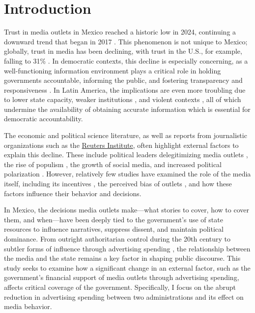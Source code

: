 \section{Introduction}

Trust in media outlets in Mexico reached a historic low in 2024, continuing a downward trend that began in 2017 \citep{Reuters}. This phenomenon is not unique to Mexico; globally, trust in media has been declining, with trust in the U.S., for example, falling to 31\% \citep{Gallup-US}. In democratic contexts, this decline is especially concerning, as a well-functioning information environment plays a critical role in holding governments accountable, informing the public, and fostering transparency and responsiveness \citep{Stromberg-MediaCoverage, Account-Boix-JoLEO}. In Latin America, the implications are even more troubling due to lower state capacity, weaker institutions \citep{Audits-Ferraz-QJE}, and violent contexts \citep{Marshall}, all of which undermine the availability of obtaining accurate information which is essential for democratic accountability.

The economic and political science literature, as well as reports from journalistic organizations such as the \href{https://reutersinstitute.politics.ox.ac.uk/}{Reuters Institute}, often highlight external factors to explain this decline. These include political leaders delegitimizing media outlets \citep{PressCriticism-Carlson-Journalism}, the rise of populism \citep{Populism-MediaTrust, PolEconPop-Guriev-JEL}, the growth of social media, and increased political polarization \citep{Account-Larreguy-WP}. However, relatively few studies have examined the role of the media itself, including its incentives \citep{ArgCorr-DiTella-AEJAE}, the perceived bias of outlets \citep{Mullainathan-MediaBias, Stromberg-MediaBias, Gentz-MediaBias}, and how these factors influence their behavior and decisions.

In Mexico, the decisions media outlets make—what stories to cover, how to cover them, and when—have been deeply tied to the government’s use of state resources to influence narratives, suppress dissent, and maintain political dominance. From outright authoritarian control during the 20th century \citep{FourthState-Lawson-Book} to subtler forms of influence through advertising spending \citep{Times}, the relationship between the media and the state remains a key factor in shaping public discourse. This study seeks to examine how a significant change in an external factor, such as the government’s financial support of media outlets through advertising spending, affects critical coverage of the government. Specifically, I focus on the abrupt reduction in advertising spending between two administrations and its effect on media behavior.

